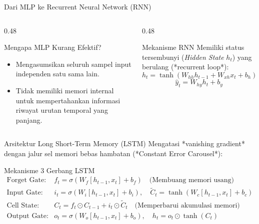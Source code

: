 \documentclass[aspectratio=169, 10pt]{beamer}
\begin{document}
\begin{frame}{Dari MLP ke Recurrent Neural Network (RNN)}
    \begin{columns}[T]
        \begin{column}{0.48\textwidth}
            \begin{block}{Mengapa MLP Kurang Efektif?}
                \begin{itemize}
                    \item Mengasumsikan seluruh sampel input independen satu sama lain.
                    \item Tidak memiliki memori internal untuk mempertahankan informasi riwayat urutan temporal yang panjang.
                \end{itemize}
            \end{block}
        \end{column}
        \begin{column}{0.48\textwidth}
            \begin{block}{Mekanisme RNN}
                Memiliki status tersembunyi (\textit{Hidden State} $h_t$) yang berulang (*recurrent loop*):
                \begin{equation}
                    h_t = \tanh(W_{hh} h_{t-1} + W_{xh} x_t + b_h)
                \end{equation}
                \begin{equation}
                    \hat{y}_t = W_{hy} h_t + b_y
                \end{equation}
            \end{block}
        \end{column}
    \end{columns}
\end{frame}

\begin{frame}{Arsitektur Long Short-Term Memory (LSTM)}
    Mengatasi *vanishing gradient* dengan jalur sel memori bebas hambatan (*Constant Error Carousel*):
    \begin{block}{Mekanisme 3 Gerbang LSTM}
        \begin{equation*}
        \begin{aligned}
            \text{Forget Gate: } &f_t = \sigma(W_f [h_{t-1}, x_t] + b_f) \quad \text{(Membuang memori usang)} \\
            \text{Input Gate: } &i_t = \sigma(W_i [h_{t-1}, x_t] + b_i), \quad \tilde{C}_t = \tanh(W_c [h_{t-1}, x_t] + b_c) \\
            \text{Cell State: } &C_t = f_t \odot C_{t-1} + i_t \odot \tilde{C}_t \quad \text{(Memperbarui akumulasi memori)} \\
            \text{Output Gate: } &o_t = \sigma(W_o [h_{t-1}, x_t] + b_o), \quad h_t = o_t \odot \tanh(C_t)
        \end{aligned}
        \end{equation*}
    \end{block}
\end{frame}
\end{document}
